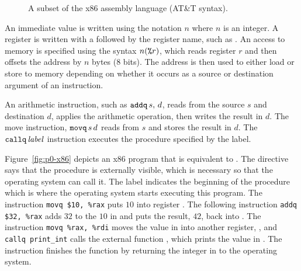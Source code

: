 \documentclass[11pt]{book}
\begin{document}
\begin{figure}[tbp]
\caption{A subset of the x86 assembly language (AT\&T syntax).}
\label{fig:x86-a}
\end{figure}

An immediate value is written using the notation \key{\$}$n$ where $n$
is an integer. 
%
A register is written with a \key{\%} followed by the register name,
such as .
%
An access to memory is specified using the syntax $n(\texttt{\%}r)$,
which reads register $r$ and then offsets the address by $n$ bytes
(8 bits). The address is then used to either load or store to memory
depending on whether it occurs as a source or destination argument of
an instruction.

An arithmetic instruction, such as $\texttt{addq}\,s,\,d$, reads from the
source $s$ and destination $d$, applies the arithmetic operation, then
writes the result in $d$.
%
The move instruction, $\texttt{movq}\,s\,d$ reads from $s$ and stores the
result in $d$. 
%
The $\texttt{callq}\,\mathit{label}$ instruction executes the procedure
specified by the label.

Figure~\ref{fig:p0-x86} depicts an x86 program that is equivalent
to . The  directive says that the
 procedure is externally visible, which is necessary so
that the operating system can call it. The label 
indicates the beginning of the  procedure which is where
the operating system starts executing this program.  The instruction
\lstinline{movq $10, %rax} puts $10$ into register . The
following instruction \lstinline{addq $32, %rax} adds $32$ to the
$10$ in  and puts the result, $42$, back into
. The instruction \lstinline{movq %rax, %rdi} moves the value 
in  into another register, , and 
\lstinline{callq print_int} calls the external function , which
prints the value in .
The instruction  finishes the 
function by returning the integer in  to the
operating system.
\end{document}
